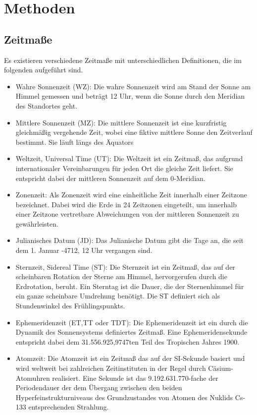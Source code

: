\section{Methoden}
\subsection{Zeitmaße}

Es existieren verschiedene Zeitmaße mit unterschiedlichen Definitionen, die im folgenden aufgeführt sind.
\begin{itemize}
\item Wahre Sonnenzeit (WZ): Die wahre Sonnenzeit wird am Stand der Sonne am Himmel gemessen und beträgt 12 Uhr, wenn die Sonne durch den Meridian des Standortes geht.
\item Mittlere Sonnenzeit (MZ): Die mittlere Sonnenzeit ist eine kurzfristig gleichmäßig vergehende Zeit, wobei eine fiktive mittlere Sonne den Zeitverlauf bestimmt. Sie läuft längs des Äquators
\item Weltzeit, Universal Time (UT): Die Weltzeit ist ein Zeitmaß, das aufgrund internationaler Vereinbarungen für jeden Ort die gleiche Zeit liefert. Sie entspricht dabei der mittleren Sonnenzeit auf dem 0-Meridian.
\item Zonenzeit: Als Zonenzeit wird eine einheitliche Zeit innerhalb einer Zeitzone bezeichnet. Dabei wird die Erde in 24 Zeitzonen eingeteilt, um innerhalb einer Zeitzone vertretbare Abweichungen von der mittleren Sonnenzeit zu gewährleisten.
\item Julianisches Datum (JD): Das Julianische Datum gibt die Tage an, die seit dem 1. Januar -4712, 12 Uhr vergangen sind.
\item Sternzeit, Sidereal Time (ST): Die Sternzeit ist ein Zeitmaß, das auf der scheinbaren Rotation der Sterne am Himmel, hervorgerufen durch die Erdrotation, beruht. Ein Sterntag ist die Dauer, die der Sternenhimmel für ein ganze scheinbare Umdrehung benötigt. Die ST definiert sich als Stundenwinkel des Frühlingspunkts.
\item Ephemeridenzeit (ET,TT oder TDT): Die Ephemeridenzeit ist ein durch die Dynamik des Sonnensystems definiertes Zeitmaß. Eine Ephemeridensekunde entspricht dabei dem 31.556.925,9747ten Teil des Tropischen Jahres 1900. 
\item Atomzeit: Die Atomzeit ist ein Zeitmaß das auf der SI-Sekunde basiert und wird weltweit bei zahlreichen Zeitinstituten in der Regel durch Cäsium-Atomuhren realisiert. Eine Sekunde ist das 9.192.631.770-fache der Periodendauer der dem Übergang zwischen den beiden Hyperfeinstrukturniveaus des Grundzustandes von Atomen des Nuklids Cs-133 entsprechenden Strahlung.
\end{itemize}

